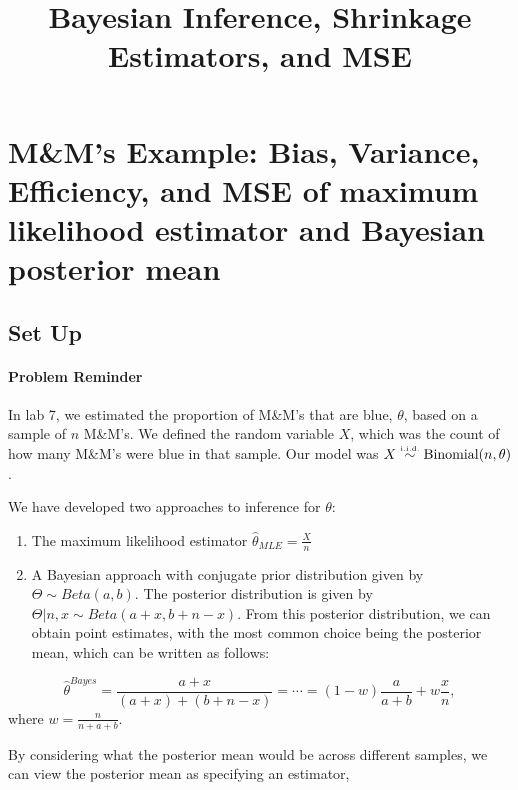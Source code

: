 \documentclass[]{article}
\title{Bayesian Inference, Shrinkage Estimators, and MSE}
\author{}
\date{}
\let\oldparagraph\paragraph
\renewcommand{\paragraph}[1]{\oldparagraph{#1}\mbox{}}
\begin{document}
\maketitle

\def\simiid{\stackrel{{\mbox{\text{\tiny i.i.d.}}}}{\sim}}

\section{M\&M's Example: Bias, Variance, Efficiency, and MSE of maximum
likelihood estimator and Bayesian posterior
mean}\label{mms-example-bias-variance-efficiency-and-mse-of-maximum-likelihood-estimator-and-bayesian-posterior-mean}

\subsection{Set Up}\label{set-up}

\paragraph{Problem Reminder}\label{problem-reminder}

In lab 7, we estimated the proportion of M\&M's that are blue,
\(\theta\), based on a sample of \(n\) M\&M's. We defined the random
variable \(X\), which was the count of how many M\&M's were blue in that
sample. Our model was \(X \simiid \text{Binomial}(n, \theta)\).

We have developed two approaches to inference for \(\theta\):

\begin{enumerate}
\def\labelenumi{\arabic{enumi}.}
\item
  The maximum likelihood estimator \(\hat{\theta}_{MLE} = \frac{X}{n}\)
\item
  A Bayesian approach with conjugate prior distribution given by
  \(\Theta \sim Beta(a, b)\). The posterior distribution is given by
  \(\Theta | n, x \sim Beta(a + x, b + n - x)\). From this posterior
  distribution, we can obtain point estimates, with the most common
  choice being the posterior mean, which can be written as follows:
\end{enumerate}

\[\hat{\theta}^{Bayes} = \frac{a + x}{(a + x) + (b + n - x)} = \cdots = (1 - w) \frac{a}{a + b} + w\frac{x}{n},\]
where \(w = \frac{n}{n + a + b}\).

By considering what the posterior mean would be across different
samples, we can view the posterior mean as specifying an estimator,
\end{document}

